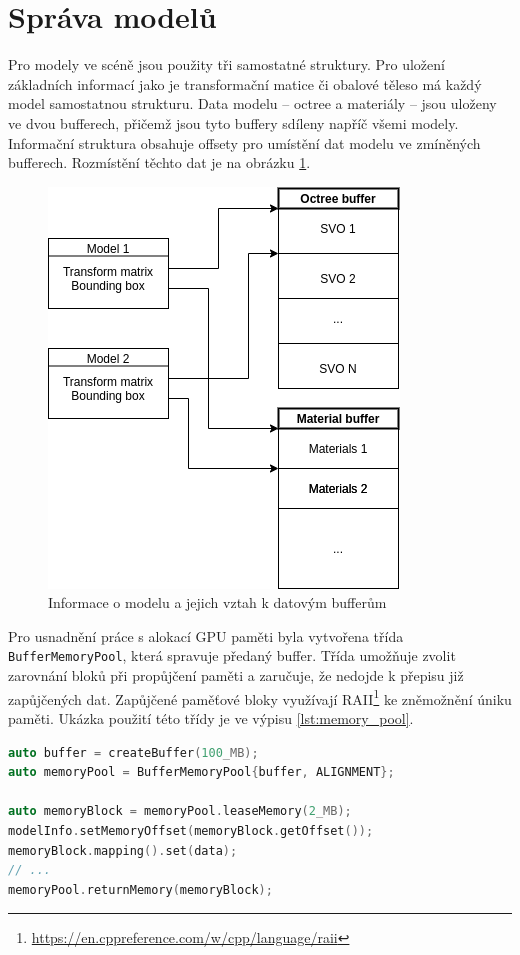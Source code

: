 \section{Správa modelů} \label{sec:model_management}

Pro modely ve scéně jsou použity tři samostatné struktury. Pro uložení základních informací jako je transformační matice či obalové těleso má každý model samostatnou strukturu. Data modelu -- octree a materiály -- jsou uloženy ve dvou bufferech, přičemž jsou tyto buffery sdíleny napříč všemi modely. Informační struktura obsahuje offsety pro umístění dat modelu ve zmíněných bufferech. Rozmístění těchto dat je na obrázku \ref{fig:model_storage}.

\begin{figure}[H]
	\centering
	\includegraphics[scale=0.7]{images/model_storage.png}
	\caption{Informace o modelu a jejich vztah k datovým bufferům}
	\label{fig:model_storage}
\end{figure}

Pro usnadnění práce s alokací GPU paměti byla vytvořena třída \texttt{BufferMemoryPool}, která spravuje předaný buffer. Třída umožňuje zvolit zarovnání bloků při propůjčení paměti a zaručuje, že nedojde k přepisu již zapůjčených dat. Zapůjčené paměťové bloky využívají RAII\footnote{\url{https://en.cppreference.com/w/cpp/language/raii}} ke zněmožnění úniku paměti.  Ukázka použití této třídy je ve výpisu \ref{lst:memory_pool}.

\begin{lstlisting}[label={lst:memory_pool}, language=C++, caption={Ukázka využití memory pool}]
auto buffer = createBuffer(100_MB);
auto memoryPool = BufferMemoryPool{buffer, ALIGNMENT};

auto memoryBlock = memoryPool.leaseMemory(2_MB);
modelInfo.setMemoryOffset(memoryBlock.getOffset());
memoryBlock.mapping().set(data);
// ...
memoryPool.returnMemory(memoryBlock);
\end{lstlisting}

